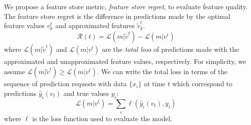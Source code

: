 
We propose a feature store metric, \textit{feature store regret}, to evaluate feature quality. The feature store regret is the difference in predictions made by the optimal feature values $v_k^t$ and approximated features $\tilde{v}_k^t$. 
\begin{equation}
    \mathcal{R}(t) = \mathcal{L}(m|\tilde{v}^t) - \mathcal{L}(m|v^t)
\end{equation}
where $\mathcal{L}(m|\tilde{v}^t)$ and $\mathcal{L}(m|v^t)$ are the \textit{total loss} of predictions made with the approximated and unapproximated feature values, respectively. For simplicity, we assume $\mathcal{L}(m|\tilde{v}^t) \ge \mathcal{L}(m|v^t)$. We can write the total loss in terms of the sequence of prediction requests with data $\{x_i\}$ at time $t$ which correspond to predictions $\hat{y}_i(v_t)$ and true values $y_i$: 
\begin{equation}
     \mathcal{L}(m|v^t) = \sum_{i}\ell\left(\hat{y}_i(v_t), y_i\right)
\end{equation}
where $\ell$ is the loss function used to evaluate the model. 


